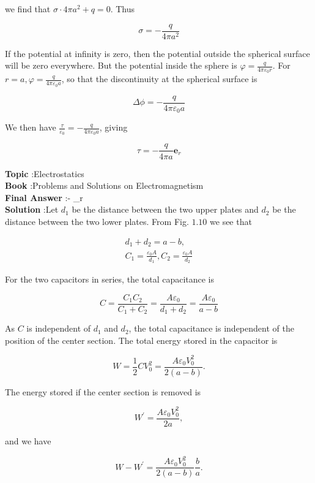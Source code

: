 \documentclass[10pt]{article}
\begin{document}
we find that $\sigma \cdot 4 \pi a^{2}+q=0$. Thus

$$
\sigma=-\frac{q}{4 \pi a^{2}}
$$

If the potential at infinity is zero, then the potential outside the spherical surface will be zero everywhere. But the potential inside the sphere is $\varphi=\frac{q}{4 \pi \varepsilon_{0} r}$. For $r=a, \varphi=\frac{q}{4 \pi \varepsilon_{0} a}$, so that the discontinuity at the spherical surface is

$$
\Delta \phi=-\frac{q}{4 \pi \varepsilon_{0} a}
$$

We then have $\frac{\tau}{\varepsilon_{0}}=-\frac{q}{4 \pi \varepsilon_{0} a}$, giving

$$
\tau=-\frac{q}{4 \pi a} \mathbf{e}_{r}
$$




\textbf{Topic} :Electrostatics\\
\textbf{Book} :Problems and Solutions on Electromagnetism\\
\textbf{Final Answer} :- _{r}\\


\textbf{Solution} :Let $d_{1}$ be the distance between the two upper plates and $d_{2}$ be the distance between the two lower plates. From Fig. $1.10$ we see that

$$
\begin{gathered}
d_{1}+d_{2}=a-b, \\
C_{1}=\frac{\varepsilon_{0} A}{d_{1}}, C_{2}=\frac{\varepsilon_{0} A}{d_{2}}
\end{gathered}
$$

For the two capacitors in series, the total capacitance is

$$
C=\frac{C_{1} C_{2}}{C_{1}+C_{2}}=\frac{A \varepsilon_{0}}{d_{1}+d_{2}}=\frac{A \varepsilon_{0}}{a-b}
$$

As $C$ is independent of $d_{1}$ and $d_{2}$, the total capacitance is independent of the position of the center section. The total energy stored in the capacitor is

$$
W=\frac{1}{2} C V_{0}^{2}=\frac{A \varepsilon_{0} V_{0}^{2}}{2(a-b)} .
$$

The energy stored if the center section is removed is

$$
W^{\prime}=\frac{A \varepsilon_{0} V_{0}^{2}}{2 a},
$$

and we have

$$
W-W^{\prime}=\frac{A \varepsilon_{0} V_{0}^{2}}{2(a-b)} \frac{b}{a} .
$$
\end{document}
